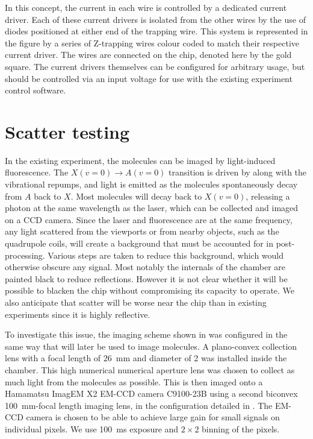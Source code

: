 In this concept, the current in each wire is controlled by a dedicated current
driver. Each of these current drivers is isolated from the other wires by the
use of diodes positioned at either end of the trapping wire. This system is
represented in the figure by a series of Z-trapping wires colour coded to match
their respective current driver. The wires are connected on the chip, denoted
here by the gold square. The current drivers themselves can be configured for
arbitrary usage, but should be controlled via an input voltage for use with the
existing \CaF{} experiment control software.

\section{Scatter testing}
\label{exper:scatter}

In the existing \CaF{} experiment, the molecules can be imaged by light-induced
fluorescence.  The $X(v=0)\rightarrow A(v=0)$ transition is driven by
 along with the vibrational repumps, and light is emitted as the
molecules spontaneously decay from $A$ back to $X$. Most molecules will decay
back to $X(v=0)$, releasing a photon at the same wavelength as the laser, which
can be collected and imaged on a CCD camera. Since the laser and fluorescence
are at the same frequency, any light scattered from the viewports or from
nearby objects, such as the quadrupole coils, will create a background that must
be accounted for in post-processing.  Various steps are taken to reduce this
background, which would otherwise obscure any signal. Most notably the
internals of the chamber are painted black to reduce reflections. However it is
not clear whether it will be possible to blacken the chip without compromising
its capacity to operate. We also anticipate that scatter will be worse near the
chip than in existing experiments since it is highly reflective.

To investigate this issue, the imaging scheme shown in
 was configured in the same way that will later
be used to image molecules.  A plano-convex collection lens with a focal length
of \SI{26}{\milli\meter} and diameter of \SI{2}{\inch} was installed inside the
chamber. This high numerical numerical aperture lens was chosen to collect as
much light from the molecules as possible. This is then imaged onto a Hamamatsu
ImagEM X2 EM-CCD camera C9100-23B using a second biconvex
\SI{100}{\milli\meter}-focal length imaging lens, in the configuration detailed
in . The EM-CCD camera is chosen to be able to
achieve large gain for small signals on individual pixels. We use
\SI{100}{\milli\second} exposure and $2\times2$ binning of the pixels.

